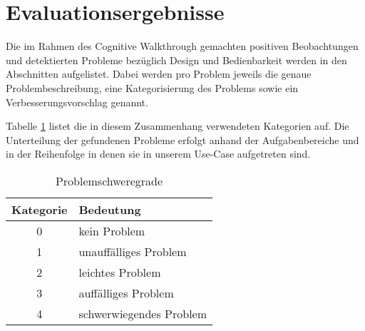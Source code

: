\section{Evaluationsergebnisse}
Die im Rahmen des Cognitive Walkthrough gemachten positiven Beobachtungen und detektierten Probleme bezüglich Design und Bedienbarkeit werden in den Abschnitten aufgelistet. Dabei werden pro Problem jeweils die genaue Problembeschreibung, eine Kategorisierung des Problems sowie ein Verbesserungsvorschlag genannt.

Tabelle \ref{tbl:categories} listet die in diesem Zusammenhang verwendeten Kategorien auf. Die Unterteilung der gefundenen Probleme erfolgt anhand der Aufgabenbereiche und in der Reihenfolge in denen sie in unserem Use-Case aufgetreten sind.

\begin{table}[h]
	\centering\begin{tabular}{|c|l|}
		\hline
		\textbf{Kategorie} & \textbf{Bedeutung} \\
		\hline
		0 & kein Problem \\
		1 & unauffälliges Problem \\
		2 & leichtes Problem \\
		3 & auffälliges Problem \\
		4 & schwerwiegendes Problem \\
		\hline
	\end{tabular}
	\caption{Problemschweregrade\label{tbl:categories}}
\end{table}